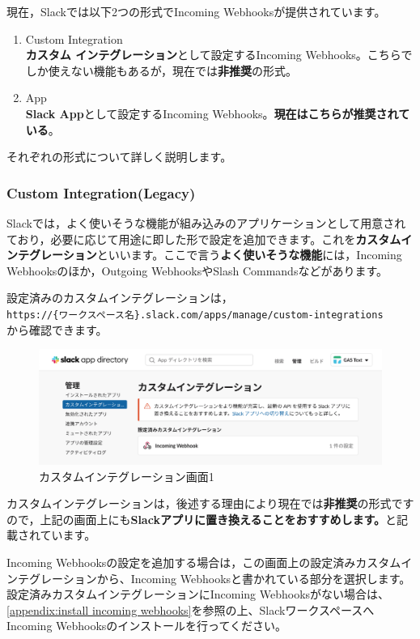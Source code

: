 \documentclass[uplatex,a4j]{jsarticle}
\begin{document}
現在，Slackでは以下2つの形式でIncoming Webhooksが提供されています。
\begin{enumerate}
\item Custom Integration\\
\textbf{カスタム インテグレーション}として設定するIncoming Webhooks。こちらでしか使えない機能もあるが，現在では\textbf{非推奨}の形式。
\item App\\
\textbf{Slack App}として設定するIncoming Webhooks。\textbf{現在はこちらが推奨されている}。
\end{enumerate}

それぞれの形式について詳しく説明します。

\subsubsection{Custom Integration(Legacy)}

Slackでは，よく使いそうな機能が組み込みのアプリケーションとして用意されており，必要に応じて用途に即した形で設定を追加できます。これを\textbf{カスタムインテグレーション}といいます。ここで言う\textbf{よく使いそうな機能}には，Incoming Webhooksのほか，Outgoing WebhooksやSlash Commandsなどがあります。

設定済みのカスタムインテグレーションは，\\
\verb|https://{ワークスペース名}.slack.com/apps/manage/custom-integrations|\\
から確認できます。

\begin{figure}[h]
 \centering
 \includegraphics[keepaspectratio, scale=0.6]{images/custom_integration1.png}
 \caption{カスタムインテグレーション画面1}
 \label{fig:custom_integration1}
\end{figure}

カスタムインテグレーションは，後述する理由により現在では\textbf{非推奨}の形式ですので，上記の画面上にも\textbf{Slackアプリに置き換えることをおすすめします。}と記載されています。


Incoming Webhooksの設定を追加する場合は，この画面上の設定済みカスタムインテグレーションから、Incoming Webhooksと書かれている部分を選択します。設定済みカスタムインテグレーションにIncoming Webhooksがない場合は、\ref{appendix:install incoming webhooks}を参照の上、SlackワークスペースへIncoming Webhooksのインストールを行ってください。
\end{document}
